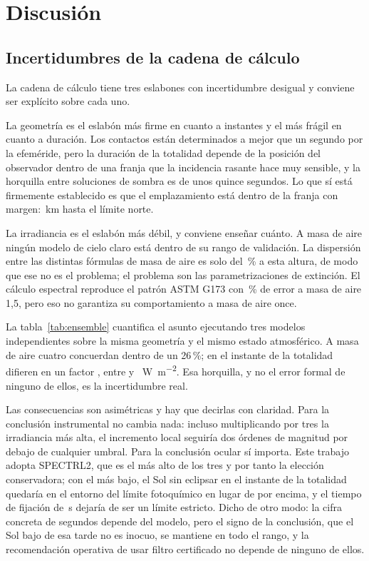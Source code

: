 \documentclass[10pt,a4paper]{article}
\begin{document}
\section{Discusión}

\subsection{Incertidumbres de la cadena de cálculo}

La cadena de cálculo tiene tres eslabones con incertidumbre desigual y conviene
ser explícito sobre cada uno.

La geometría es el eslabón más firme en cuanto a instantes y el más frágil en
cuanto a duración. Los contactos están determinados a mejor que un segundo por
la efeméride, pero la duración de la totalidad depende de la posición del
observador dentro de una franja que la incidencia rasante hace muy sensible, y
la horquilla entre soluciones de sombra es de unos quince segundos. Lo que sí
está firmemente establecido es que el emplazamiento está dentro de la franja con
margen: \northLimit\,km hasta el límite norte.

La irradiancia es el eslabón más débil, y conviene enseñar cuánto. A masa de
aire \amMax{} ningún modelo de cielo claro está dentro de su rango de
validación. La dispersión entre las distintas fórmulas de masa de aire es solo
del \amSpread\,\% a esta altura, de modo que ese no es el problema; el problema
son las parametrizaciones de extinción. El cálculo espectral reproduce el patrón
ASTM G173 con \gerr\,\% de error a masa de aire 1,5, pero eso no garantiza su
comportamiento a masa de aire once.

La tabla~\ref{tab:ensemble} cuantifica el asunto ejecutando tres modelos
independientes sobre la misma geometría y el mismo estado atmosférico. A masa de
aire cuatro concuerdan dentro de un 26\,\%; en el instante de la totalidad
difieren en un factor \dniMaxSpread, entre \dniMaxLow{} y
\dniMaxHigh~\si{\watt\per\square\meter}. Esa horquilla, y no el error formal de
ninguno de ellos, es la incertidumbre real.



Las consecuencias son asimétricas y hay que decirlas con claridad. Para la
conclusión instrumental no cambia nada: incluso multiplicando por tres la
irradiancia más alta, el incremento local seguiría dos órdenes de magnitud por
debajo de cualquier umbral. Para la conclusión ocular sí importa. Este trabajo
adopta SPECTRL2, que es el más alto de los tres y por tanto la elección
conservadora; con el más bajo, el Sol sin eclipsar en el instante de la
totalidad quedaría en el entorno del límite fotoquímico en lugar de por encima,
y el tiempo de fijación de \stareNoEclMax\,s dejaría de ser un límite estricto.
Dicho de otro modo: la cifra concreta de segundos depende del modelo, pero el
signo de la conclusión, que el Sol bajo de esa tarde no es inocuo, se mantiene
en todo el rango, y la recomendación operativa de usar filtro certificado no
depende de ninguno de ellos.
\end{document}
